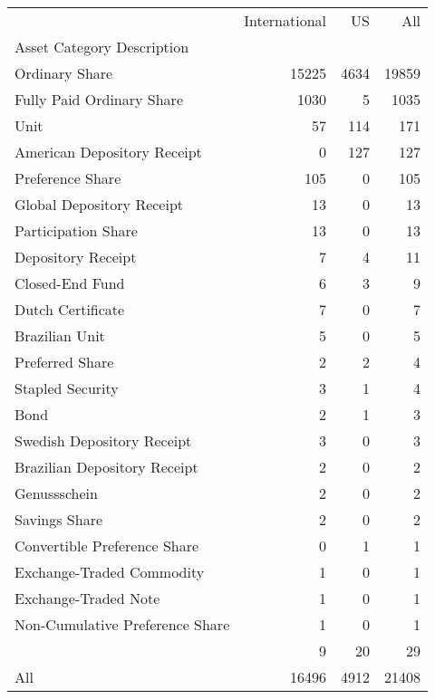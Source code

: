 \begin{tabular}{lrrr}
\toprule
{} &  International &    US &    All \\
Asset Category Description      &                &       &        \\
\midrule
Ordinary Share                  &          15225 &  4634 &  19859 \\
Fully Paid Ordinary Share       &           1030 &     5 &   1035 \\
Unit                            &             57 &   114 &    171 \\
American Depository Receipt     &              0 &   127 &    127 \\
Preference Share                &            105 &     0 &    105 \\
Global Depository Receipt       &             13 &     0 &     13 \\
Participation Share             &             13 &     0 &     13 \\
Depository Receipt              &              7 &     4 &     11 \\
Closed-End Fund                 &              6 &     3 &      9 \\
Dutch Certificate               &              7 &     0 &      7 \\
Brazilian Unit                  &              5 &     0 &      5 \\
Preferred Share                 &              2 &     2 &      4 \\
Stapled Security                &              3 &     1 &      4 \\
Bond                            &              2 &     1 &      3 \\
Swedish Depository Receipt      &              3 &     0 &      3 \\
Brazilian Depository Receipt    &              2 &     0 &      2 \\
Genussschein                    &              2 &     0 &      2 \\
Savings Share                   &              2 &     0 &      2 \\
Convertible Preference Share    &              0 &     1 &      1 \\
Exchange-Traded Commodity       &              1 &     0 &      1 \\
Exchange-Traded Note            &              1 &     0 &      1 \\
Non-Cumulative Preference Share &              1 &     0 &      1 \\
                                &              9 &    20 &     29 \\
All                             &          16496 &  4912 &  21408 \\
\bottomrule
\end{tabular}
